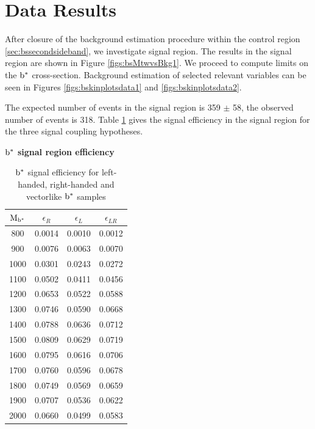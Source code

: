 \section{Data Results}
After closure of the background estimation procedure within the control region \ref{sec:bssecondsideband}, we investigate signal region.  
The results in the signal region are shown in Figure \ref{figs:bsMtwvsBkg1}.  We proceed to compute 
limits on the $\mathrm{b}^{*}$ cross-section.  Background estimation of selected relevant variables can be seen in 
Figures \ref{figs:bskinplotsdata1} and \ref{figs:bskinplotsdata2}.

The expected number of events in the signal region is 359 $\pm$ 58, the observed number of events is 318.  Table \ref{table:bssigeff} gives the signal efficiency in the signal region for 
the three signal coupling hypotheses.

\begin{table}
\begin{center}
\bf{$\mathrm{b}^{*}$ signal region efficiency}\\
\begin{tabular}{c||c|c|c}
\hline\hline
\bf{$\mathrm{M_{\mathrm{b}^{*}}}$} & \bf{$\epsilon_{R}$}  & \bf{$\epsilon_{L}$} & \bf{$\epsilon_{LR}$} \\
\hline\hline
800 & 0.0014 & 0.0010 & 0.0012\\
900 & 0.0076 & 0.0063 & 0.0070\\
1000 & 0.0301 & 0.0243 & 0.0272\\
1100 & 0.0502 & 0.0411 & 0.0456\\
1200 & 0.0653 & 0.0522 & 0.0588\\
1300 & 0.0746 & 0.0590 & 0.0668\\
1400 & 0.0788 & 0.0636 & 0.0712\\
1500 & 0.0809 & 0.0629 & 0.0719\\
1600 & 0.0795 & 0.0616 & 0.0706\\
1700 & 0.0760 & 0.0596 & 0.0678\\
1800 & 0.0749 & 0.0569 & 0.0659\\
1900 & 0.0707 & 0.0536 & 0.0622\\
2000 & 0.0660 & 0.0499 & 0.0583\\
\hline
\end{tabular}
\end{center}
\caption{$\mathrm{b}^{*}$ signal efficiency for left-handed, right-handed and vectorlike $\mathrm{b}^{*}$ samples}
\label{table:bssigeff}
\end{table}





